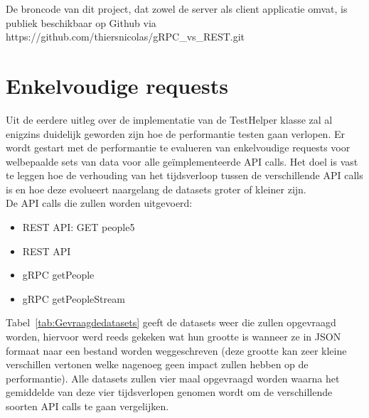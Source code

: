 De broncode van dit project, dat zowel de server als client applicatie omvat, is publiek beschikbaar op Github via https://github.com/thiersnicolas/gRPC\_vs\_REST.git

\section{Enkelvoudige requests}
\label{enkelvoudigerequestsmethodologie}

Uit de eerdere uitleg over de implementatie van de TestHelper klasse zal al enigzins duidelijk geworden zijn hoe de performantie testen gaan verlopen.
Er wordt gestart met de performantie te evalueren van enkelvoudige requests voor welbepaalde sets van data voor alle geïmplementeerde API calls.
Het doel is vast te leggen hoe de verhouding van het tijdsverloop tussen de verschillende API calls is en hoe deze evolueert naargelang de
datasets groter of kleiner zijn.\\

De API calls die zullen worden uitgevoerd:
\begin{itemize}
    \item REST API: GET people5
    \item REST API
    \item gRPC getPeople
    \item gRPC getPeopleStream
\end{itemize}

Tabel~\ref{tab:Gevraagdedatasets} geeft de datasets weer die zullen opgevraagd worden, hiervoor werd reeds gekeken wat hun grootte is
wanneer ze in JSON formaat naar een bestand worden weggeschreven (deze grootte kan zeer kleine verschillen vertonen welke nagenoeg geen impact zullen hebben op de performantie).
Alle datasets zullen vier maal opgevraagd worden waarna het gemiddelde van deze vier tijdsverlopen genomen wordt om de verschillende soorten API calls te gaan vergelijken.\\

